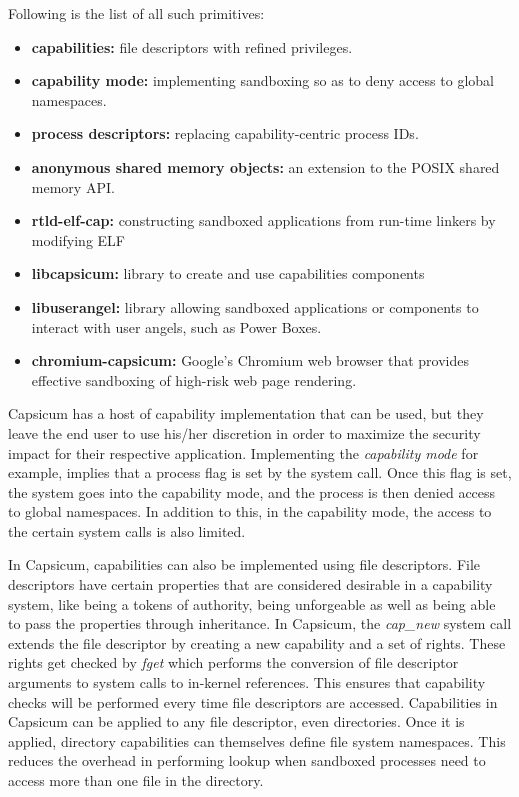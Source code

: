 Following is the list of all such primitives:

		\begin{itemize}
		    \item \textbf{capabilities:} file descriptors with refined privileges.
   		    \item \textbf{capability mode:} implementing sandboxing so as to deny access to global namespaces.
    		    \item \textbf{process descriptors:} replacing capability-centric process IDs. 
    		    \item \textbf{anonymous shared memory objects:} an extension to the POSIX shared memory API.
    		    \item \textbf{rtld-elf-cap:} constructing sandboxed applications from run-time linkers by modifying ELF 
    		    \item \textbf{libcapsicum:} library to create and use capabilities components
    		    \item \textbf{libuserangel:} library allowing sandboxed applications or components to interact with user angels, such as Power Boxes.
    		    \item \textbf{chromium-capsicum:} Google's Chromium web browser that provides effective sandboxing of high-risk web page rendering.

		\end{itemize}
		
Capsicum has a host of capability implementation that can be used, but they leave the end user to use his/her discretion in order to maximize the security impact for their respective application. Implementing the \textit{capability mode} for example, implies that a process flag is set by the system call. Once this flag is set, the system goes into the capability mode, and the process is then denied access to global namespaces. In addition to this, in the capability mode, the access to the certain system calls is also limited.

In Capsicum, capabilities can also be implemented using file descriptors. File descriptors have certain properties that are considered desirable in a capability system, like being a tokens of authority, being unforgeable as well as being able to pass the properties through inheritance. In Capsicum, the \textit{cap\_new} system call extends the file descriptor by creating a new capability and a set of rights. These rights get checked by \textit{fget} which performs the conversion of file descriptor  arguments to system calls to in-kernel references. This ensures that capability checks will be performed every time file descriptors are accessed. Capabilities in Capsicum can be applied to any file descriptor, even directories.  Once it is applied, directory capabilities can themselves define file system namespaces. This reduces the overhead in performing lookup when sandboxed processes need to access more than one file in the directory.

